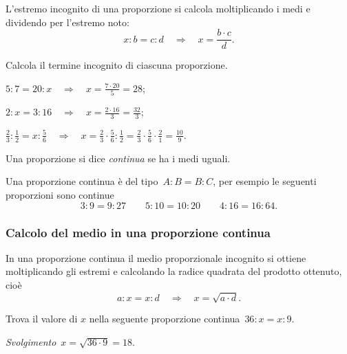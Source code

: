 L'estremo incognito di una proporzione si calcola moltiplicando i medi e dividendo per l'estremo noto:
\[x:b=c:d\quad\Rightarrow\quad x=\frac{b\cdot c}{d}.\]

\pagebreak

\begin{exrig} %
\begin{esempio}
Calcola il termine incognito di ciascuna proporzione.
\vspace{-1.3ex}\begin{itemize*}
  \item $5:7=20:x\quad\Rightarrow\quad x=\frac{7\cdot 20}{5}=28$;
  \item $2:x=3:16\quad\Rightarrow\quad x=\frac{2\cdot 16}{3}=\frac{32}{3}$;
  \item $\frac{2}{3}:\frac{1}{2}=x:\frac{5}{6}%
\quad\Rightarrow\quad x=\frac{2}{3}\cdot\frac{5}{6}:\frac{1}{2}=\frac{2}{3}%
\cdot\frac{5}{6}\cdot\frac{2}{1}=\frac{10}{9}$.
\end{itemize*}
\end{esempio}%
\end{exrig}

\begin{definizione}
  Una proporzione si dice \emph{continua} se ha i medi uguali.
\end{definizione}

Una proporzione continua è del tipo~$A:B=B:C$, per esempio le seguenti proporzioni sono continue
\[3:9=9:27\qquad5:10=10:20\qquad4:16=16:64.\]

\subsubsection*{Calcolo del medio in una proporzione continua}

In una proporzione continua il medio proporzionale incognito si ottiene moltiplicando gli estremi
e calcolando la radice quadrata del prodotto ottenuto, cioè
\[a:x=x:d\quad\Rightarrow\quad x=\sqrt{a\cdot d}.\]

\begin{exrig}
\begin{esempio}
Trova il valore di $x$ nella seguente proporzione continua~$36:x=x:9$.

\emph{Svolgimento}~$x=\sqrt{36\cdot 9}=18$.
\end{esempio}
\end{exrig}

